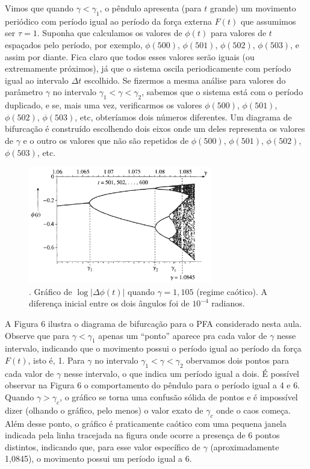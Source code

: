 \documentclass{article}
\begin{document}
Vimos que quando $\gamma < \gamma_1$, o pêndulo apresenta (para $t$ grande) um movimento periódico com período igual ao período da força externa $F(t)$ que assumimos ser $\tau = 1$. Suponha que calculamos os valores de $\phi(t)$ para valores de $t$ espaçados pelo período, por exemplo, $\phi(500)$, $\phi(501)$, $\phi(502)$, $\phi(503)$, e assim por diante. Fica claro que todos esses valores serão iguais (ou extremamente próximos), já que o sistema oscila periodicamente com período igual ao intervalo $\Delta t$ escolhido. Se fizermos a mesma análise para valores do parâmetro $\gamma$ no intervalo $\gamma_1<\gamma<\gamma_2$, sabemos que o sistema está com o período duplicado, e se, mais uma vez, verificarmos os valores $\phi(500)$, $\phi(501)$, $\phi(502)$, $\phi(503)$, etc, obteríamos dois números diferentes. Um diagrama de bifurcação é construído escolhendo dois eixos onde um deles representa os valores de $\gamma$ e o outro os valores que não são repetidos de $\phi(500)$, $\phi(501)$, $\phi(502)$, $\phi(503)$, etc. 

\begin{figure}[h]
\centering
\includegraphics[width=8cm]{bif.png}
\captionsetup{labelsep=none}
\caption{. Gráfico de $\log{|\Delta\phi(t)|}$ quando $\gamma = 1,105$ (regime caótico). A diferença inicial entre os dois ângulos foi de $10^{-4}$ radianos. }
\end{figure}

A Figura 6 ilustra o diagrama de bifurcação para o PFA considerado nesta aula. Observe que para $\gamma < \gamma_1$ apenas um ``ponto'' aparece pra cada valor de $\gamma$ nesse intervalo, indicando que o movimento possui o período igual ao período da força $F(t)$, isto é, 1. Para $\gamma$ no intervalo $\gamma_1 < \gamma < \gamma_2$ obervamos dois pontos para cada valor de $\gamma$ nesse intervalo, o que indica um período igual a dois. É possível observar na Figura 6 o comportamento do pêndulo para o período igual a 4 e 6. Quando $\gamma > \gamma_c$, o gráfico se torna uma confusão sólida de pontos e é impossível dizer (olhando o gráfico, pelo menos) o valor exato de $\gamma_c$ onde o caos começa. Além desse ponto, o gráfico é praticamente caótico com uma pequena janela indicada pela linha tracejada na figura onde ocorre a presença de 6 pontos distintos, indicando que, para esse valor específico de $\gamma$ (aproximadamente 1,0845), o movimento possui um período igual a 6. 
\end{document}
